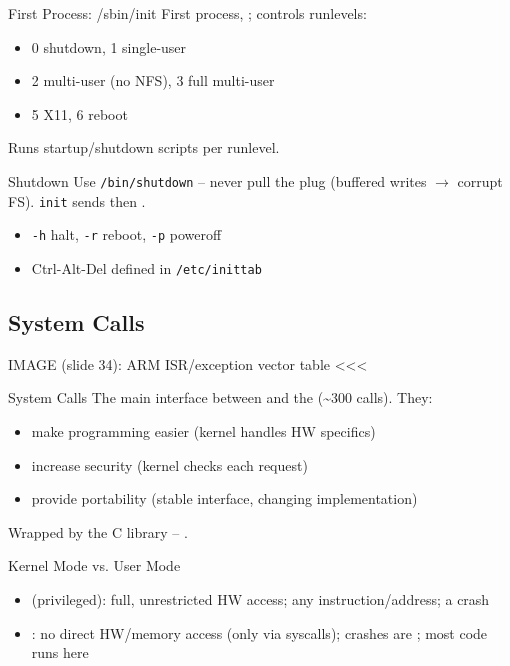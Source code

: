\begin{definition}{First Process: /sbin/init}
    First process, ; controls runlevels:
    \begin{itemize}
        \item 0 shutdown, 1 single-user
        \item 2 multi-user (no NFS), 3 full multi-user
        \item 5 X11, 6 reboot
    \end{itemize}
    Runs startup/shutdown scripts per runlevel.
\end{definition}

\begin{definition}{Shutdown}
    Use \texttt{/bin/shutdown} -- never pull the plug (buffered writes $\to$ corrupt
    FS). \texttt{init} sends  then .
    \begin{itemize}
        \item \texttt{-h} halt, \texttt{-r} reboot, \texttt{-p} poweroff
        \item Ctrl-Alt-Del defined in \texttt{/etc/inittab}
    \end{itemize}
\end{definition}

\multend

\subsection{System Calls}

IMAGE (slide 34): ARM ISR/exception vector table <<<

\begin{concept}{System Calls}
    The main interface between  and the 
    (\textasciitilde300 calls). They:
    \begin{itemize}
        \item make programming easier (kernel handles HW specifics)
        \item increase security (kernel checks each request)
        \item provide portability (stable interface, changing implementation)
    \end{itemize}
    Wrapped by the C library -- .
\end{concept}

\begin{definition}{Kernel Mode vs. User Mode}
    \begin{itemize}
        \item {} (privileged): full, unrestricted HW access;
              any instruction/address; a crash 
        \item {}: no direct HW/memory access (only via syscalls);
              crashes are ; most code runs here
    \end{itemize}
\end{definition}


